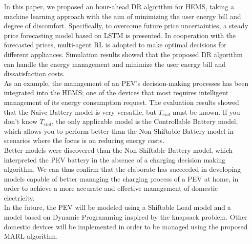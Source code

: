 In this paper, we proposed an hour-ahead DR algorithm for HEMS, taking a machine learning approach with the aim of minimizing the user energy bill and degree of discomfort. Specifically, to overcome future price uncertainties, a steady price forecasting model based on LSTM is presented. In cooperation with the forecasted prices, multi-agent RL is adopted to make optimal decisions for different appliances. Simulation results showed that the proposed DR algorithm can handle the energy management and minimize the user energy bill and dissatisfaction costs.\\
As an example, the management of an PEV's decision-making processes has been integrated into the HEMS; one of the devices that most requires intelligent management of its energy consumption request. The evaluation results showed that the Naive Battery model is very versatile, but $T_{end}$ must be known. If you don't know $T_{end}$, the only applicable model is the Controllable Battery model, which allows you to perform better than the Non-Shiftable Battery model in scenarios where the focus is on reducing energy costs. \\
Better models were discovered than the Non-Shiftable Battery model, which interpreted the PEV battery in the absence of a charging decision making algorithm. We can thus confirm that the elaborate has succeeded in developing models capable of better managing the charging process of a PEV at home, in order to achieve a more accurate and effective management of domestic electricity.\\
In the future, the PEV will be modeled using a Shiftable Load model and a model based on Dynamic Programming inspired by the knapsack problem. Other domestic devices will be implemented in order to be managed using the proposed MARL algorithm.